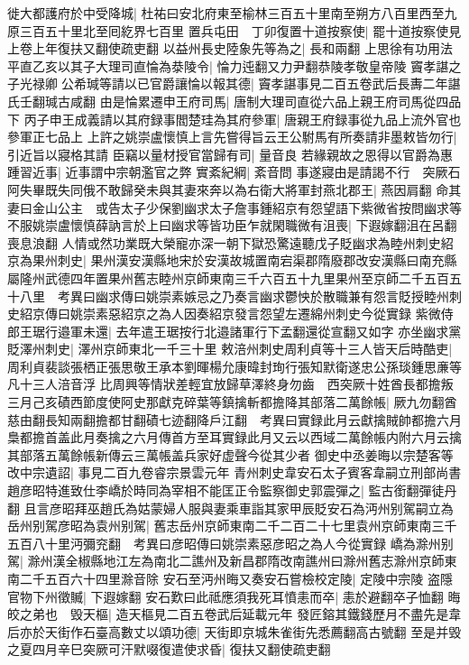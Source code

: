 徙大都護府於中受降城|{
	杜祐曰安北府東至榆林三百五十里南至朔方八百里西至九原三百五十里北至囘紇界七百里}
置兵屯田　丁卯復置十道按察使|{
	罷十道按察使見上卷上年復扶又翻使疏吏翻}
以益州長史陸象先等為之|{
	長和兩翻}
上思徐有功用法平直乙亥以其子大理司直惀為㳟陵令|{
	惀力迍翻又力尹翻恭陵孝敬皇帝陵}
竇孝諶之子光禄卿公希瑊等請以已官爵讓惀以報其德|{
	竇孝諶事見二百五卷武后長夀二年諶氏壬翻瑊古咸翻}
由是惀累遷申王府司馬|{
	唐制大理司直從六品上親王府司馬從四品下}
丙子申王成義請以其府録事閻楚珪為其府參軍|{
	唐親王府録事從九品上流外官也參軍正七品上}
上許之姚崇盧懷慎上言先嘗得旨云王公駙馬有所奏請非墨敕皆勿行|{
	引近旨以寢格其請}
臣竊以量材授官當歸有司|{
	量音良}
若緣親故之恩得以官爵為惠踵習近事|{
	近事謂中宗朝濫官之弊}
實紊紀綱|{
	紊音問}
事遂寢由是請謁不行　突厥石阿失畢既失同俄不敢歸癸未與其妻來奔以為右衛大將軍封燕北郡王|{
	燕因肩翻}
命其妻曰金山公主　或告太子少保劉幽求太子詹事鍾紹京有怨望語下紫微省按問幽求等不服姚崇盧懷慎薛訥言於上曰幽求等皆功臣乍就閑職微有沮喪|{
	下遐嫁翻沮在呂翻喪息浪翻}
人情或然功業既大榮寵亦深一朝下獄恐驚遠聽戊子貶幽求為睦州刺史紹京為果州刺史|{
	果州漢安漢縣地宋於安漢故城置南宕渠郡隋廢郡改安漢縣曰南充縣屬隆州武德四年置果州舊志睦州京師東南三千六百五十九里果州至京師二千五百五十八里　考異曰幽求傳曰姚崇素嫉忌之乃奏言幽求鬱怏於散職兼有怨言貶授睦州刺史紹京傳曰姚崇素惡紹京之為人因奏紹京發言怨望左遷綿州刺史今從實録}
紫微侍郎王琚行邉軍未還|{
	去年遣王琚按行北邉諸軍行下孟翻還從宣翻又如字}
亦坐幽求黨貶澤州刺史|{
	澤州京師東北一千三十里}
敕涪州刺史周利貞等十三人皆天后時酷吏|{
	周利貞裴談張栖正張思敬王承本劉暉楊允康暐封珣行張知默衛遂忠公孫琰鍾思亷等凡十三人涪音浮}
比周興等情狀差輕宜放歸草澤終身勿齒　西突厥十姓酋長都擔叛三月己亥磧西節度使阿史那獻克碎葉等鎮擒斬都擔降其部落二萬餘帳|{
	厥九勿翻酋慈由翻長知兩翻擔都甘翻磧七迹翻降戶江翻　考異曰實録此月云獻擒賊帥都擔六月梟都擔首盖此月奏擒之六月傳首方至耳實録此月又云以西域二萬餘帳内附六月云擒其部落五萬餘帳新傳云三萬帳盖兵家好虚聲今從其少者}
御史中丞姜晦以宗楚客等改中宗遺詔|{
	事見二百九卷睿宗景雲元年}
青州刺史韋安石太子賓客韋嗣立刑部尚書趙彦昭特進致仕李嶠於時同為宰相不能匡正令監察御史郭震彈之|{
	監古銜翻彈徒丹翻}
且言彦昭拜巫趙氏為姑蒙婦人服與妻乘車詣其家甲辰貶安石為沔州别駕嗣立為岳州别駕彦昭為袁州别駕|{
	舊志岳州京師東南二千二百二十七里袁州京師東南三千五百八十里沔彌兖翻　考異曰彦昭傳曰姚崇素惡彦昭之為人今從實録}
嶠為滁州别駕|{
	滁州漢全椒縣地江左為南北二譙州及新昌郡隋改南譙州曰滁州舊志滁州京師東南二千五百六十四里滁音除}
安石至沔州晦又奏安石嘗檢校定陵|{
	定陵中宗陵}
盗隱官物下州徵贓|{
	下遐嫁翻}
安石歎曰此祗應須我死耳憤恚而卒|{
	恚於避翻卒子恤翻}
晦皎之弟也　毁天樞|{
	造天樞見二百五卷武后延載元年}
發匠鎔其鐵錢歷月不盡先是韋后亦於天街作石臺高數丈以頌功德|{
	天街即京城朱雀街先悉薦翻高古號翻}
至是并毁之夏四月辛巳突厥可汗默啜復遣使求昏|{
	復扶又翻使疏吏翻}


